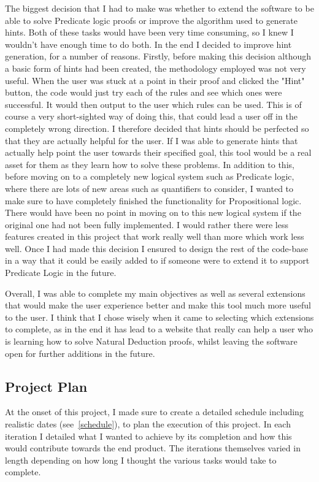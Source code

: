 The biggest decision that I had to make was whether to extend the software to be able to solve Predicate logic proofs or improve the algorithm used to generate hints. Both of these tasks would have been very time consuming, so I knew I wouldn't have enough time to do both. In the end I decided to improve hint generation, for a number of reasons. Firstly, before making this decision although a basic form of hints had been created, the methodology employed was not very useful. When the user was stuck at a point in their proof and clicked the "Hint" button,  the code would just try each of the rules and see which ones were successful. It would then output to the user which rules can be used. This is of course a very short-sighted way of doing this, that could lead a user off in the completely wrong direction. I therefore decided that hints should be perfected so that they are actually helpful for the user. If I was able to generate hints that actually help point the user towards their specified goal, this tool would be a real asset for them as they learn how to solve these problems. In addition to this, before moving on to a completely new logical system such as Predicate logic, where there are lots of new areas such as quantifiers to consider, I wanted to make sure to have completely finished the functionality for Propositional logic. There would have been no point in moving on to this new logical system if the original one had not been fully implemented. I would rather there were less features created in this project that work really well than more which work less well. Once I had made this decision I ensured to design the rest of the code-base in a way that it could be easily added to if someone were to extend it to support Predicate Logic in the future. 

Overall, I was able to complete my main objectives as well as several extensions that would make the user experience better and make this tool much more useful to the user. I think that I chose wisely when it came to selecting which extensions to complete, as in the end it has lead to a website that really can help a user who is learning how to solve Natural Deduction proofs, whilst leaving the software open for further additions in the future.

\subsection{Project Plan}

At the onset of this project, I made sure to create a detailed schedule including realistic dates (see~\ref{schedule}), to plan the execution of this project. In each iteration I detailed what I wanted to achieve by its completion and how this would contribute towards the end product. The iterations themselves varied in length depending on how long I thought the various tasks would take to complete.

